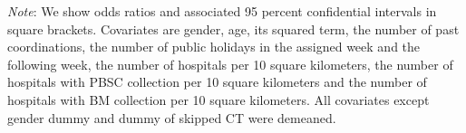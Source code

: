 \documentclass[12pt, a4paper]{article}
\begin{document}
\begin{landscape}
\begin{table}[H]
\begin{threeparttable}
\begin{tabular}[t]{lccccccccc}
\bottomrule
\end{tabular}
\begin{tablenotes}
\item \emph{Note}: We show odds ratios and associated 95 percent confidential intervals in square brackets. Covariates are gender, age, its squared term, the number of past coordinations, the number of public holidays in the assigned week and the following week, the number of hospitals per 10 square kilometers, the number of hospitals with PBSC collection per 10 square kilometers and the number of hospitals with BM collection per 10 square kilometers. All covariates except gender dummy and dummy of skipped CT were demeaned.
\end{tablenotes}
\end{threeparttable}
\end{table}
\end{landscape}

\clearpage
\end{document}
